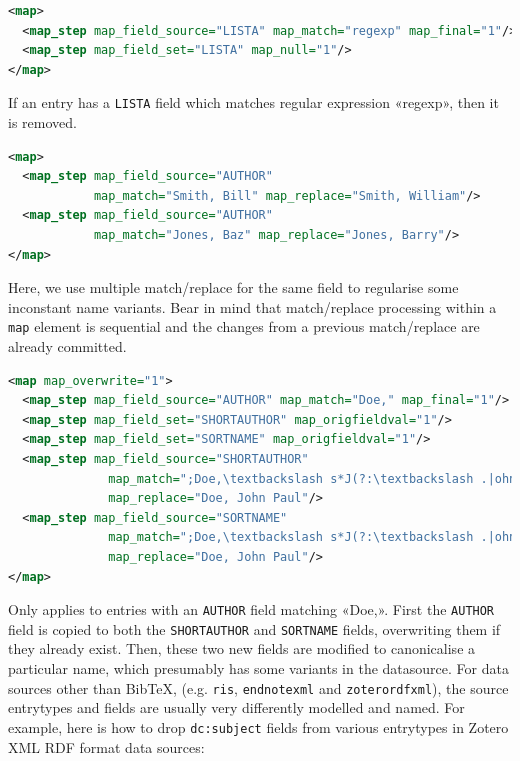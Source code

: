 \documentclass{ltxdockit}
\begin{document}
\begin{lstlisting}[language=xml,escapechar=:,mathescape=true]
<map>
  <map_step map_field_source="LISTA" map_match="regexp" map_final="1"/>
  <map_step map_field_set="LISTA" map_null="1"/>
</map>
\end{lstlisting}

\noindent If an entry has a \verb+LISTA+ field which matches regular
expression «regexp», then it is removed.

\begin{lstlisting}[language=xml,escapechar=:,mathescape=true]
<map>
  <map_step map_field_source="AUTHOR"
            map_match="Smith, Bill" map_replace="Smith, William"/>
  <map_step map_field_source="AUTHOR"
            map_match="Jones, Baz" map_replace="Jones, Barry"/>
</map>
\end{lstlisting}

\noindent Here, we use multiple match/replace for the same field to
regularise some inconstant name variants. Bear in mind that
match/replace processing within a \verb+map+ element is sequential and
the changes from a previous match/replace are already committed.

\begin{lstlisting}[language=xml,escapechar=;,mathescape=true]
<map map_overwrite="1">
  <map_step map_field_source="AUTHOR" map_match="Doe," map_final="1"/>
  <map_step map_field_set="SHORTAUTHOR" map_origfieldval="1"/>
  <map_step map_field_set="SORTNAME" map_origfieldval="1"/>
  <map_step map_field_source="SHORTAUTHOR"
              map_match=";Doe,\textbackslash s*J(?:\textbackslash .|ohn)(?:[-]*)(?:P\textbackslash .|Paul)*;"
              map_replace="Doe, John Paul"/>
  <map_step map_field_source="SORTNAME"
              map_match=";Doe,\textbackslash s*J(?:\textbackslash .|ohn)(?:[-]*)(?:P\textbackslash .|Paul)*;"
              map_replace="Doe, John Paul"/>
</map>
\end{lstlisting}

\noindent Only applies to entries with an \verb+AUTHOR+ field matching
«Doe,». First the \verb+AUTHOR+ field is copied to both the
\verb+SHORTAUTHOR+ and \verb+SORTNAME+ fields, overwriting them if they
already exist. Then, these two new fields are modified to canonicalise a
particular name, which presumably has some variants in the datasource.
\bigskip
{}
For data sources other than Bib\TeX, (e.g. \verb+ris+, \verb+endnotexml+
and \verb+zoterordfxml+), the source entrytypes and fields are usually very
differently modelled and named. For example, here is how to drop
\verb+dc:subject+ fields from various entrytypes in Zotero XML RDF format data
sources:
\end{document}
